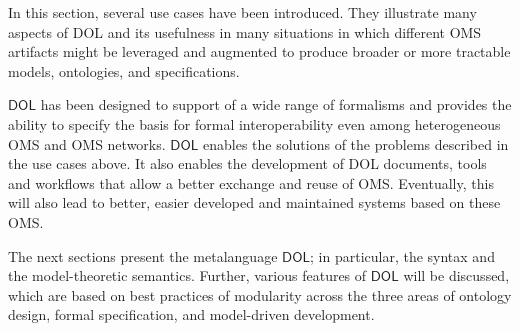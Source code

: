 \documentclass[10pt, a4paper]{isov2}
\newcommand*{\DOL}{\ensuremath{\mathsf{DOL}}\xspace}
\begin{document}


In this section, several use cases have been introduced. They illustrate many aspects of DOL and its usefulness in many situations in which different OMS artifacts might be leveraged and augmented to produce broader or more tractable models, ontologies, and specifications.

 \DOL has been designed to support of a wide range of formalisms and
provides the ability to specify the basis for formal interoperability even among heterogeneous OMS and OMS networks. \DOL enables the solutions of the problems described in the use cases above. It also enables the development of DOL documents, tools and workflows that 
allow  a better exchange and reuse of OMS. Eventually, this will also lead to better, easier developed and maintained systems based on these OMS.

The next sections present the metalanguage \DOL{}; in particular, the syntax and the model-theoretic semantics. Further, various features of \DOL will be discussed, which  are based on  best practices of modularity  across
 the three areas of ontology design, formal 
specification, and model-driven development.


\end{document}
